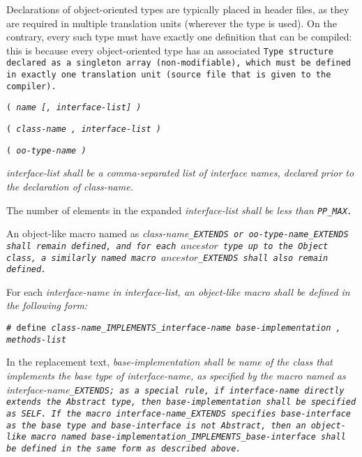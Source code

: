 Declarations of object-oriented types are typically placed in header files,
as they are required in multiple translation units (wherever the type is used).
On the contrary, every such type must have exactly one definition that can be
compiled: this is because every object-oriented type has an associated \tt{Type}
structure declared as a singleton array (non-modifiable), which must be defined
in exactly one translation unit (source file that is given to the compiler).

\enlargethispage*{\baselineskip}
\pagebreak


\s\s\s\tt{(} \it{name} [\tt{,} \it{interface-list}] \tt{)}

\s\tt{(} \it{class-name} \tt{,} \it{interface-list} \tt{)}

\s\tt{(} \it{oo-type-name} \tt{)}


\it{interface-list} shall be a comma-separated list of interface
names, declared prior to the declaration of \it{class-name}.

The number of elements in the expanded
\it{interface-list} shall be less than \tt{PP_MAX}.

An object-like macro named as \it{class-name}\tt{_EXTENDS} or
\it{oo-type-name}\tt{_EXTENDS} shall remain defined, and for each
$ancestor$ type up to the \tt{Object} class, a similarly named macro
$ancestor$\tt{_EXTENDS} shall also remain defined.

For each \it{interface-name} in \it{interface-list}, an
object-like macro shall be defined in the following form:

\begin{center}
\tt{# define} \it{class-name}\tt{_IMPLEMENTS_}\it{interface-name}
\it{base-implementation} \tt{,} \it{methods-list}
\end{center}

In the replacement text, \it{base-implementation} shall be name
of the class that implements the base type of \it{interface-name},
as specified by the macro named as \it{interface-name}\tt{_EXTENDS};
as a special rule, if \it{interface-name} directly extends the \tt{Abstract}
type, then \it{base-implementation} shall be specified as \tt{SELF}.
If the macro \it{interface-name}\tt{_EXTENDS} specifies \it{base-interface} as
the base type and \it{base-interface} is not \tt{Abstract}, then an object-like
macro named \it{base-implementation}\tt{_IMPLEMENTS_}\it{base-interface}
shall be defined in the same form as described above.

